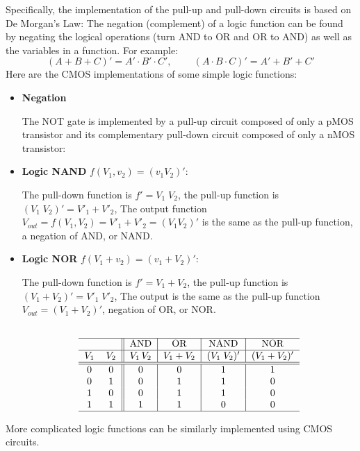 \begin{itemize}
Specifically, the implementation of the pull-up and pull-down circuits is 
based on De Morgan's Law: The negation (complement) of a logic function can
be found by negating the logical operations (turn AND to OR and OR to AND) 
as well as the variables in a function. For example:
\[
(A+B+C)'=A'\cdot B'\cdot C',\;\;\;\;\;\;\;\;(A\cdot B\cdot C)'=A'+B'+C' 
\]
Here are the CMOS implementations of some simple logic functions:
\begin{itemize}
\item {\bf Negation}

  The NOT gate is implemented by a pull-up circuit composed of only a pMOS 
  transistor and its complementary pull-down circuit composed of only a nMOS
  transistor:


\item {\bf Logic NAND} $f(V_1,v_2)=(v_1 V_2)'$:

  The pull-down function is $f'=V_1\;V_2$, the pull-up function is 
  $(V_1\;V_2)'=V'_1+V'_2$,
  The output function $V_{out}=f(V_1,V_2)=V'_1+V'_2=(V_1 V_2)'$ is the 
  same as the pull-up function, a negation of AND, or NAND.

\item {\bf Logic NOR} $f(V_1+v_2)=(v_1+V_2)'$:

  The pull-down function is $f'=V_1+V_2$, the  pull-up function is
  $(V_1+V_2)'=V'_1\;V'_2$,
  The output is the same as the pull-up function $V_{out}=(V_1+V_2)'$,
  negation of OR, or NOR.

  \[ \begin{tabular}{cc||c|c|c|c} \\ \hline 
    &       &  AND & OR & NAND         &   NOR        \\ \hline
    $V_1$ 	& $V_2$ & $V_1\,V_2$ & $V_1+V_2$ &  $(V_1\; V_2)'$ & $(V_1+V_2)'$ \\ \hline \hline
    0 	& 0 	& 0 & 0 & 1		 & 1            \\
    0 	& 1 	& 0 & 1 & 1		 & 0            \\
    1 	& 0 	& 0 & 1 & 1		 & 0            \\
    1 	& 1 	& 1 & 1 & 0		 & 0            \\ \hline
  \end{tabular} \]

\end{itemize}


More complicated logic functions can be similarly implemented using CMOS
circuits.


\end{itemize}
